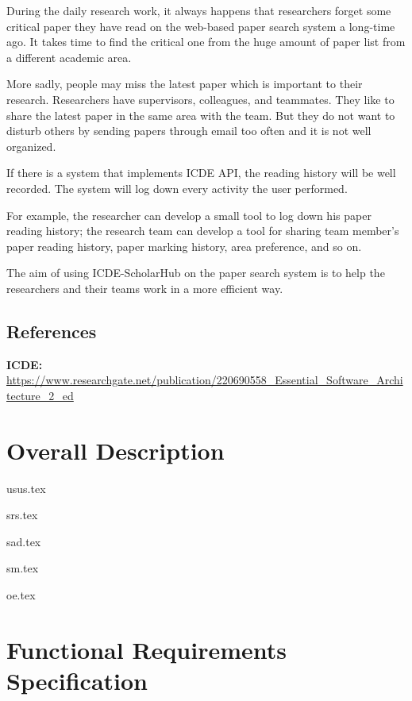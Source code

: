 \documentclass[]{scrreprt}
\begin{document}
During the daily research work, it always happens that researchers forget some critical paper they have read on the web-based paper search system a long-time ago. It takes time to find the critical one from the huge amount of paper list from a different academic area.

More sadly, people may miss the latest paper which is important to their research. Researchers have supervisors, colleagues, and teammates. They like to share the latest paper in the same area with the team. But they do not want to disturb others by sending papers through email too often and it is not well organized.

If there is a  system that implements ICDE API, the reading history will be well recorded. The system will log down every activity the user performed.

For example, the researcher can develop a small tool to log down his paper reading history; the research team can develop a tool for sharing team member’s paper reading history,  paper marking history, area preference, and so on.

The aim of using ICDE-ScholarHub on the paper search system is to help the researchers and their teams work in a more efficient way.

\section{References}

\noindent
\textbf{ICDE: } \url{https://www.researchgate.net/publication/220690558_Essential_Software_Architecture_2_ed}

\chapter{Overall Description}

{usus.tex}

{srs.tex}

{sad.tex}

{sm.tex}

{oe.tex}

\chapter{Functional Requirements Specification}
\end{document}
